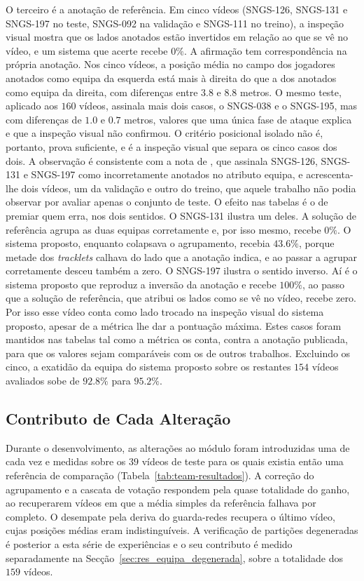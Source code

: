 O terceiro é a anotação de referência. Em cinco vídeos (SNGS-126, SNGS-131 e SNGS-197 no teste, SNGS-092 na validação e SNGS-111 no treino), a inspeção visual mostra que os lados anotados estão invertidos em relação ao que se vê no vídeo, e um sistema que acerte recebe $0\%$. A afirmação tem correspondência na própria anotação. Nos cinco vídeos, a posição média no campo dos jogadores anotados como equipa da esquerda está mais à direita do que a dos anotados como equipa da direita, com diferenças entre $3.8$ e $8.8$ metros. O mesmo teste, aplicado aos $160$ vídeos, assinala mais dois casos, o SNGS-038 e o SNGS-195, mas com diferenças de $1.0$ e $0.7$ metros, valores que uma única fase de ataque explica e que a inspeção visual não confirmou. O critério posicional isolado não é, portanto, prova suficiente, e é a inspeção visual que separa os cinco casos dos dois. A observação é consistente com a nota de \citet{oo2026broadcast2pitch}, que assinala SNGS-126, SNGS-131 e SNGS-197 como incorretamente anotados no atributo equipa, e acrescenta-lhe dois vídeos, um da validação e outro do treino, que aquele trabalho não podia observar por avaliar apenas o conjunto de teste. O efeito nas tabelas é o de premiar quem erra, nos dois sentidos. O SNGS-131 ilustra um deles. A solução de referência agrupa as duas equipas corretamente e, por isso mesmo, recebe $0\%$. O sistema proposto, enquanto colapsava o agrupamento, recebia $43.6\%$, porque metade dos \emph{tracklets} calhava do lado que a anotação indica, e ao passar a agrupar corretamente desceu também a zero. O SNGS-197 ilustra o sentido inverso. Aí é o sistema proposto que reproduz a inversão da anotação e recebe $100\%$, ao passo que a solução de referência, que atribui os lados como se vê no vídeo, recebe zero. Por isso esse vídeo conta como lado trocado na inspeção visual do sistema proposto, apesar de a métrica lhe dar a pontuação máxima. Estes casos foram mantidos nas tabelas tal como a métrica os conta, contra a anotação publicada, para que os valores sejam comparáveis com os de outros trabalhos. Excluindo os cinco, a exatidão da equipa do sistema proposto sobre os restantes $154$ vídeos avaliados sobe de $92.8\%$ para $95.2\%$.

\subsection{Contributo de Cada Alteração}\label{sec:res_equipa_ablacao}

Durante o desenvolvimento, as alterações ao módulo foram introduzidas uma de cada vez e medidas sobre os $39$ vídeos de teste para os quais existia então uma referência de comparação (Tabela~\ref{tab:team-resultados}). A correção do agrupamento e a cascata de votação respondem pela quase totalidade do ganho, ao recuperarem vídeos em que a média simples da referência falhava por completo. O desempate pela deriva do guarda-redes recupera o último vídeo, cujas posições médias eram indistinguíveis. A verificação de partições degeneradas é posterior a esta série de experiências e o seu contributo é medido separadamente na Secção~\ref{sec:res_equipa_degenerada}, sobre a totalidade dos $159$ vídeos.

